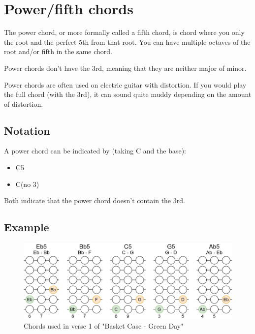 \section{Power/fifth chords}

The power chord, or more formally called a fifth chord, is chord where you only the root and the perfect 5th from that root. You can have multiple octaves of the root and/or fifth in the same chord.

Power chords don't have the 3rd, meaning that they are neither major of minor.

Power chords are often used on electric guitar with distortion. If you would play the full chord (with the 3rd), it can sound quite muddy depending on the amount of distortion.


\subsection{Notation}
A power chord can be indicated by (taking C and the base):

\begin{itemize}
	\item C5
	\item C(no 3)
\end{itemize}

Both indicate that the power chord doesn't contain the 3rd.

\subsection{Example}

\begin{figure}[h]
	\centering
	\includegraphics[height=0.16\textheight]{../../Images/ChordsUsedInBasketCaseGreenDayVerse1.png}
	\caption{Chords used in verse 1 of "Basket Case - Green Day"}
	\label{fig:guitar_chords_verse_1_basket_case_green_day}
\end{figure}

